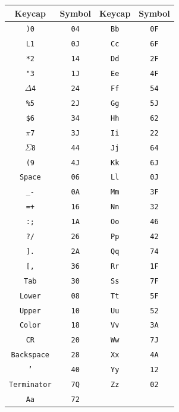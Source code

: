 \begin{center}
\small
\begin{tabular}{cc|cc}
	
    \toprule
    \textbf{Keycap}    & \textbf{Symbol} & \textbf{Keycap}    & \textbf{Symbol} \\
    \midrule
	\texttt{)0}         & \texttt{04}	& \texttt{Bb}        & \texttt{0F}  \\
	\texttt{L1}         & \texttt{0J}	& \texttt{Cc}        & \texttt{6F}  \\
	\texttt{*2}       	& \texttt{14}	& \texttt{Dd} 		  & \texttt{2F}  \\
	\texttt{"3}    	    & \texttt{1J}	& \texttt{Ee}        & \texttt{4F}   \\
	\texttt{$\Delta$4}  & \texttt{24}	& \texttt{Ff}        & \texttt{54}  \\
	\texttt{\%5}       & \texttt{2J}	& \texttt{Gg}        & \texttt{5J}  \\
	\texttt{\$6}       & \texttt{34} 	& \texttt{Hh}        & \texttt{62}  \\
	\texttt{$\pi$7}    & \texttt{3J}	& \texttt{Ii}        & \texttt{22}  \\
	\texttt{$\Sigma$8} & \texttt{44}	& \texttt{Jj} 	     & \texttt{64}   \\
	\texttt{(9}        & \texttt{4J}	& \texttt{Kk}        & \texttt{6J}  \\
	\texttt{Space}    & \texttt{06}		& \texttt{Ll}        & \texttt{0J}  \\
	\texttt{\_-}		  & \texttt{0A}		& \texttt{Mm}        & \texttt{3F}  \\
	\texttt{=+}        & \texttt{16}	& \texttt{Nn}        & \texttt{32}  \\
	\texttt{:;}        & \texttt{1A}	& \texttt{Oo}        & \texttt{46}  \\
	\texttt{?/}        & \texttt{26} 	& \texttt{Pp}        & \texttt{42}  \\
	\texttt{].}        & \texttt{2A}	& \texttt{Qq}        & \texttt{74}  \\
	\texttt{[,}        & \texttt{36}	& \texttt{Rr}        & \texttt{1F}  \\
	\texttt{Tab}       & \texttt{30}	& \texttt{Ss}        & \texttt{7F}  \\
	\texttt{Lower}     & \texttt{08}	& \texttt{Tt}        & \texttt{5F}  \\
	\texttt{Upper}     & \texttt{10}	& \texttt{Uu}        & \texttt{52}  \\
	\texttt{Color}     & \texttt{18}	& \texttt{Vv}        & \texttt{3A}  \\
	\texttt{CR}        & \texttt{20}	& \texttt{Ww}        & \texttt{7J}  \\
	\texttt{Backspace} & \texttt{28} 	& \texttt{Xx}        & \texttt{4A}  \\
	\texttt{'}         & \texttt{40} 	& \texttt{Yy}        & \texttt{12}  \\
	\texttt{Terminator} & \texttt{7Q}	& \texttt{Zz}         & \texttt{02} \\
	\texttt{Aa}        & \texttt{72} 	&					&				\\
    \bottomrule
\end{tabular}
\end{center}

